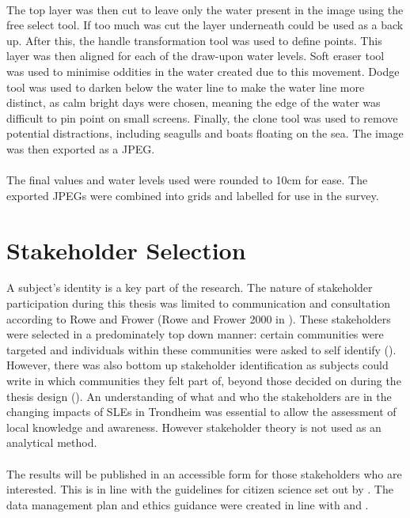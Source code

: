 \paragraph{}
The top layer was then cut to leave only the water present in the image using the free select tool. If too much was cut the layer underneath could be used as a back up. After this, the handle transformation tool was used to define points. This layer was then aligned for each of the draw-upon water levels. Soft eraser tool was used to minimise oddities in the water created due to this movement. Dodge tool was used to darken below the water line to make the water line more distinct, as calm bright days were chosen, meaning the edge of the water was difficult to pin point on small screens. Finally, the clone tool was used to remove potential distractions, including seagulls and boats floating on the sea. The image was then exported as a JPEG. 

\paragraph{}
The final values and water levels used were rounded to 10cm for ease. The exported JPEGs were combined into grids and labelled for use in the survey. 

\section{Stakeholder Selection}
A subject's identity is a key part of the research. The nature of stakeholder participation during this thesis was limited to communication and consultation according to Rowe and Frower  (Rowe and Frower 2000 in \cite{reed_stakeholder_2008}). These stakeholders were selected in a predominately top down manner:  certain communities were targeted and individuals within these communities were asked to self identify (\cite{reed_stakeholder_2008}). However, there was also bottom up stakeholder identification as subjects could write in which communities they felt part of, beyond those decided on during the thesis design (\cite{reed_stakeholder_2008}). An understanding of what and who the stakeholders are in the changing impacts of SLEs in Trondheim was essential to allow the assessment of local knowledge and awareness. However stakeholder theory is not used as an analytical method.
\paragraph{}
The results will be published in an accessible form for those stakeholders who are interested. This is in line with the guidelines for citizen science set out by \cite{tweddle_guide_2012}. The data management plan and ethics guidance were created in line with \cite{nesh_guidelines_2022} and \cite{nsd_norsk_nodate}. 

